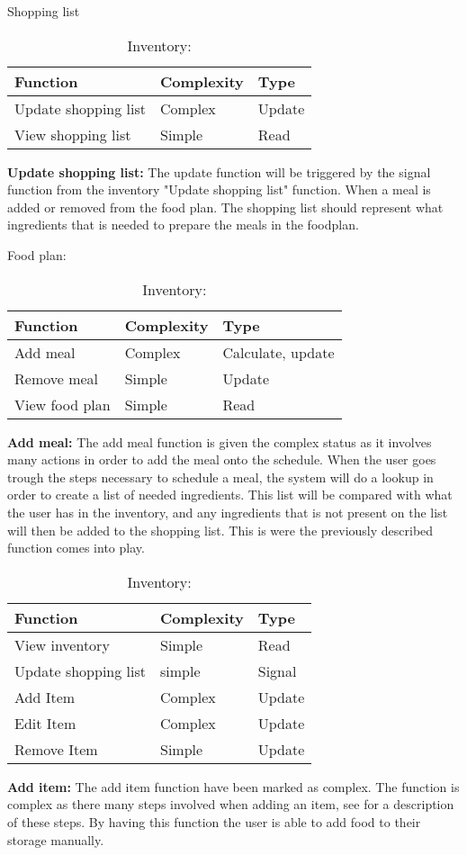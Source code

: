 \begin{table}[H]
	\centering
	\caption{Shopping list}
	\begin{tabular}{|l|l|l|}\hline
		\textbf{Function}&\textbf{Complexity}&\textbf{Type}\\\hline
	  Update shopping list  &  Complex & Update \\\hline
	  View shopping list    &  Simple  & Read   \\\hline
  \end{tabular}
  \begin{flushleft}
    \textbf{Update shopping list:} The update function will be triggered by the signal function from the inventory "Update shopping list" function. When a meal is added or removed from the food plan. The shopping list should represent what ingredients that is needed to prepare the meals in the foodplan.
  \end{flushleft}
	\caption{Food plan:}
  \begin{tabular}{|l|l|l|}\hline
		\textbf{Function}&\textbf{Complexity}&\textbf{Type}\\\hline
	  Add meal              &  Complex & Calculate, update \\\hline
	  Remove meal           &  Simple  & Update            \\\hline
	  View food plan        &  Simple  & Read              \\\hline
  \end{tabular}
  \begin{flushleft}
    \textbf{Add meal:} The add meal function is given the complex status as it involves many actions in order to add the meal onto the schedule. When the user goes trough the steps necessary to schedule a meal, the system will do a lookup in order to create a list of needed ingredients. This list will be compared with what the user has in the inventory, and any ingredients that is not present on the list will then be added to the shopping list. This is were the previously described function comes into play.
  \end{flushleft}
	\caption{Inventory:}
  \begin{tabular}{|l|l|l|}\hline
		\textbf{Function}&\textbf{Complexity}&\textbf{Type}\\\hline
	  View inventory        &  Simple  & Read   \\\hline
	  Update shopping list  &  simple  & Signal \\\hline
	  Add Item              &  Complex & Update \\\hline
	  Edit Item             &  Complex & Update \\\hline
	  Remove Item           &  Simple  & Update \\\hline
  \end{tabular}
  \begin{flushleft}  	  
    \textbf{Add item:} The add item function have been marked as complex. The function is complex as there many steps involved when adding an item, see  for a description of these steps. By having this function the user is able to add food to their storage manually.
    

\end{flushleft}
\end{table}
